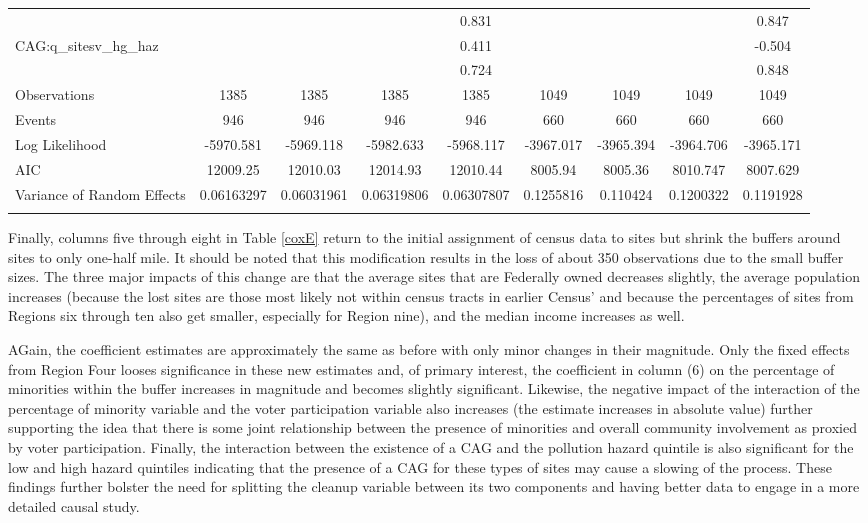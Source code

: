 \documentclass[12pt]{article}
\begin{document}
{\begin{table}[H]
{\begin{tabular}{l|cccc|cccc}
        ~ & ~ & ~ & ~ & 0.831 & ~ & ~ & ~ & 0.847 \\ 
        CAG:q\_sitesv\_hg\_haz & ~ & ~ & ~ & 0.411 & ~ & ~ & ~ & -0.504 \\ 
        ~ & ~ & ~ & ~ & 0.724 & ~ & ~ & ~ & 0.848 \\ \hline
        Observations & 1385 & 1385 & 1385 & 1385 & 1049 & 1049 & 1049 & 1049 \\ 
        Events & 946 & 946 & 946 & 946 & 660 & 660 & 660 & 660 \\ 
        Log Likelihood & -5970.581 & -5969.118 & -5982.633 & -5968.117 & -3967.017 & -3965.394 & -3964.706 & -3965.171 \\ 
        AIC & 12009.25 & 12010.03 & 12014.93 & 12010.44 & 8005.94 & 8005.36 & 8010.747 & 8007.629 \\ 
        Variance of Random Effects & 0.06163297 & 0.06031961 & 0.06319806 & 0.06307807 & 0.1255816 & 0.110424 & 0.1200322 & 0.1191928 \\ 
			\hline
			\addlinespace[1ex]
			\multicolumn{3}{l}{\textsuperscript{***}$p\leq0.01$, 
				\textsuperscript{**}$p\leq0.05$, 
				\textsuperscript{*}$p\leq0.10$}
	\end{tabular}}
\end{table}


Finally, columns five through eight in Table \ref{coxE} return to the initial assignment of census data to sites but shrink the buffers around sites to only one-half mile. It should be noted that this modification results in the loss of about 350 observations due to the small buffer sizes. The three major impacts of this change are that the average sites that are Federally owned decreases slightly, the average population increases (because the lost sites are those most likely not within census tracts in earlier Census' and because the percentages of sites from Regions six through ten also get smaller, especially for Region nine), and the median income increases as well. 

AGain, the coefficient estimates are approximately the same as before with only minor changes in their magnitude. Only the fixed effects from Region Four looses significance in these new estimates and, of primary interest, the coefficient in column (6) on the percentage of minorities within the buffer increases in magnitude and becomes slightly significant. Likewise, the negative impact of the interaction of the percentage of minority variable and the voter participation variable also increases (the estimate increases in absolute value) further supporting the idea that there is some joint relationship between the presence of minorities and overall community involvement as proxied by voter participation. Finally, the interaction between the existence of a CAG and the pollution hazard quintile is also significant for the low and high hazard quintiles indicating that the presence of a CAG for these types of sites may cause a slowing of the process. These findings further bolster the need for splitting the cleanup variable between its two components and having better data to engage in a more detailed causal study. 

}
\end{document}
